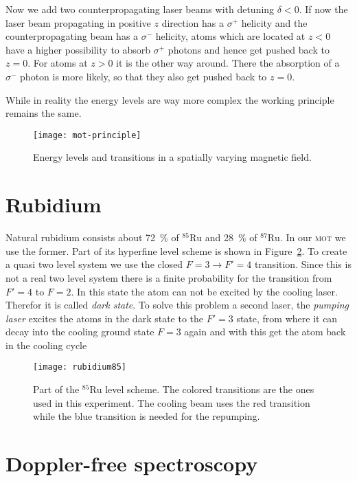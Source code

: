 \documentclass[11pt, english, fleqn, DIV=15, headinclude, BCOR=2cm]{scrreprt}
\newcommand\mot{\textsc{mot}}
\begin{document}
Now we add two counterpropagating laser beams with detuning $\delta<0$. If now
the laser beam propagating in positive $z$ direction has a $\sigma^+$ helicity
and the counterpropagating beam has a $\sigma^-$ helicity, atoms which are
located at $z<0$ have a higher possibility to absorb $\sigma^+$ photons and
hence get pushed back to $z=0$. For atoms at $z>0$ it is the other way around.
There the absorption of a $\sigma^-$ photon is more likely, so that they 
also get pushed back to $z=0$.

While in reality the energy levels are way more complex the working principle
remains the same.

\begin{figure}
    \centering
    \texttt{[image: mot-principle]}
    \caption{%
        Energy levels and transitions in a spatially varying magnetic field.
    }
    \label{fig:mot-principle}
\end{figure}

\section{Rubidium}

Natural rubidium consists about \SI{72}{\percent} of ${}^{85}\text{Ru}$ and
\SI{28}{\percent} of ${}^{87}\text{Ru}$. In our \mot{} we use the former.
Part of its hyperfine level scheme is shown in Figure~\ref{fig:rubidium85}. To
create a quasi two level system we use the closed $F=3 \to F'=4$ transition.
Since this is not a real two level system there is a finite probability for the
transition from $F'=4$ to $F=2$. In this state the atom can not be excited by
the cooling laser. Therefor it is called \emph{dark state}. To solve this
problem a second laser, the \emph{pumping laser} excites the atoms in the dark
state to the $F'=3$ state, from where it can decay into the cooling ground
state $F=3$ again and with this get the atom back in the cooling cycle

\begin{figure}
    \centering
    \texttt{[image: rubidium85]}
    \caption{%
        Part of the ${}^{85}\text{Ru}$ level scheme. The colored transitions
        are the ones used in this experiment. The cooling beam uses the red
        transition while the blue transition is needed for the repumping.
    }
    \label{fig:rubidium85}
\end{figure}

\section{Doppler-free spectroscopy}
\end{document}
